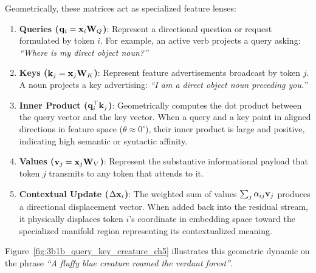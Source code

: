 \documentclass[../../../main.tex]{subfiles}
\begin{document}
Geometrically, these matrices act as specialized feature lenses:
\begin{enumerate}
    \item \textbf{Queries ($\mathbf{q}_i = \mathbf{x}_i \mathbf{W}_Q$)}: Represent a directional question or request formulated by token $i$. For example, an active verb projects a query asking: \emph{``Where is my direct object noun?''}
    \item \textbf{Keys ($\mathbf{k}_j = \mathbf{x}_j \mathbf{W}_K$)}: Represent feature advertisements broadcast by token $j$. A noun projects a key advertising: \emph{``I am a direct object noun preceding you.''}
    \item \textbf{Inner Product ($\mathbf{q}_i^\top \mathbf{k}_j$)}: Geometrically computes the dot product between the query vector and the key vector. When a query and a key point in aligned directions in feature space ($\theta \approx 0^\circ$), their inner product is large and positive, indicating high semantic or syntactic affinity.
    \item \textbf{Values ($\mathbf{v}_j = \mathbf{x}_j \mathbf{W}_V$)}: Represent the substantive informational payload that token $j$ transmits to any token that attends to it.
    \item \textbf{Contextual Update ($\Delta \mathbf{x}_i$)}: The weighted sum of values $\sum_j \alpha_{ij} \mathbf{v}_j$ produces a directional displacement vector. When added back into the residual stream, it physically displaces token $i$'s coordinate in embedding space toward the specialized manifold region representing its contextualized meaning.
\end{enumerate}

Figure~\ref{fig:3b1b_query_key_creature_ch5} illustrates this geometric dynamic on the phrase \emph{``A fluffy blue creature roamed the verdant forest''}.
\end{document}
